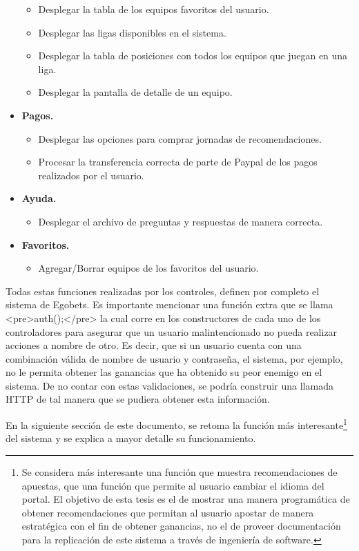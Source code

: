 \begin{itemize}
\begin{itemize}
				\item Desplegar la tabla de los equipos favoritos del usuario.
				\item Desplegar las ligas disponibles en el sistema.
				\item Desplegar la tabla de posiciones con todos los equipos que juegan en una liga.
				\item Desplegar la pantalla de detalle de un equipo.
			\end{itemize}
			\item \textbf{Pagos.}
			\begin{itemize}
				\item Desplegar las opciones para comprar jornadas de recomendaciones.
				\item Procesar la transferencia correcta de parte de Paypal de los pagos realizados por el usuario.
			\end{itemize}
			\item \textbf{Ayuda.}
			\begin{itemize}
				\item Desplegar el archivo de preguntas y respuestas de manera correcta.
			\end{itemize}
			\item \textbf{Favoritos.}
			\begin{itemize}
				\item Agregar/Borrar equipos de los favoritos del usuario.
			\end{itemize}
			
		\end{itemize}
	
Todas estas funciones realizadas por los controles, definen por completo el sistema de Egobets. Es importante mencionar una función extra que se llama <pre>auth();</pre> la cual corre en los constructores de cada uno de los controladores para asegurar que un usuario malintencionado no pueda realizar acciones a nombre de otro. Es decir, que si un usuario cuenta con una combinación válida de nombre de usuario y contraseña, el sistema, por ejemplo, no le permita obtener las ganancias que ha obtenido su peor enemigo en el sistema. De no contar con estas validaciones, se podría construir una llamada HTTP de tal manera que se pudiera obtener esta información.

En la siguiente sección de este documento, se retoma la función más interesante\footnote{Se considera más interesante una función que muestra recomendaciones de apuestas, que una función que permite al usuario cambiar el idioma del portal. El objetivo de esta tesis es el de mostrar una manera programática de obtener recomendaciones que permitan al usuario apostar de manera estratégica con el fin de obtener ganancias, no el de proveer documentación para la replicación de este sistema a través de ingeniería de software.} del sistema y se explica a mayor detalle su funcionamiento.


